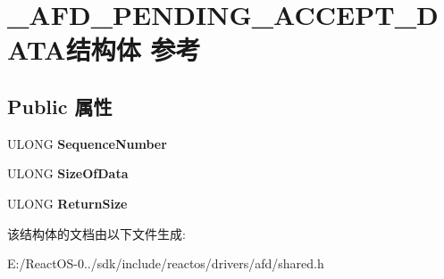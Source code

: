 \hypertarget{struct___a_f_d___p_e_n_d_i_n_g___a_c_c_e_p_t___d_a_t_a}{}\section{\+\_\+\+A\+F\+D\+\_\+\+P\+E\+N\+D\+I\+N\+G\+\_\+\+A\+C\+C\+E\+P\+T\+\_\+\+D\+A\+T\+A结构体 参考}
\label{struct___a_f_d___p_e_n_d_i_n_g___a_c_c_e_p_t___d_a_t_a}
\subsection*{Public 属性}
\begin{DoxyCompactItemize}
\item 
\mbox{\label{struct___a_f_d___p_e_n_d_i_n_g___a_c_c_e_p_t___d_a_t_a_ab4aca6d6af2944cabb8e0751d28f7f9a}} 
U\+L\+O\+NG {\bfseries Sequence\+Number}
\item 
\mbox{\label{struct___a_f_d___p_e_n_d_i_n_g___a_c_c_e_p_t___d_a_t_a_a3750da28b0a84943f877c4310e974e89}} 
U\+L\+O\+NG {\bfseries Size\+Of\+Data}
\item 
\mbox{\label{struct___a_f_d___p_e_n_d_i_n_g___a_c_c_e_p_t___d_a_t_a_a39dd75269126cb3e9da674e264340e6c}} 
U\+L\+O\+NG {\bfseries Return\+Size}
\end{DoxyCompactItemize}


该结构体的文档由以下文件生成\+:\begin{DoxyCompactItemize}
\item 
E\+:/\+React\+O\+S-\/0../sdk/include/reactos/drivers/afd/shared.\+h\end{DoxyCompactItemize}
